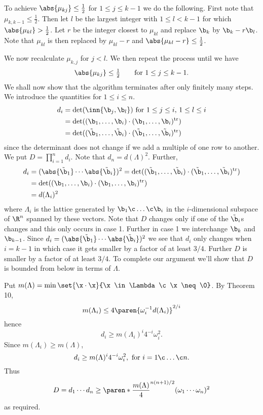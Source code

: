 To achieve $\abs{\mu_{kj}}\leq\frac12$ for $1\leq j\leq k-1$ we do the following.  First note that $\mu_{k,k-1}\leq\frac12$.  Then let $l$ be the largest integer with $1\leq l<k-1$ for which $\abs{\mu_{kl}}>\frac12$.  Let $r$ be the integer closest to $\mu_{kl}$ and replace $\b_k$ by $\b_k-r\b_l$.  Note that $\mu_{kl}$ is then replaced by $\mu_{kl}-r$ and $\abs{\mu_{kl}-r}\leq\frac12$.

We now recalculate $\mu_{k,j}$ for $j<l$.  We then repeat the process until we have
\[ \abs{\mu_{kj}}\leq\tfrac12 \qquad\text{for $1\leq j\leq k-1$} . \]
We shall now show that the algorithm terminates after only finitely many steps.  We introduce the quantities for $1\leq i\leq n$.
\begin{align*}
d_i &= \det(\inn{\b_j,\b_l}) \text{ for $1\leq j\leq i$, $1\leq l\leq i$} \\
&= \det((\b_1,\dotsc,\b_i)\cdot(\b_1,\dotsc,\b_i)^\text{tr}) \\
&= \det((\tilde\b_1,\dotsc,\tilde\b_i)\cdot(\tilde\b_1,\dotsc,\tilde\b_i)^\text{tr})
\end{align*}
since the determinant does not change if we add a multiple of one row to another.  We put $D=\prod_{i=1}^n d_i$.  Note that $d_n=d(\Lambda)^2$.  Further,
\begin{align*}
d_i &= (\abs{\tilde\b_1}\dotsm\abs{\tilde\b_i})^2 = \det((\tilde\b_1,\dotsc,\tilde\b_i)\cdot(\tilde\b_1,\dotsc,\tilde\b_i)^\text{tr}) \\
&= \det((\b_1,\dotsc,\b_i)\cdot(\b_1,\dotsc,\b_i)^\text{tr}) \\
&= d(\Lambda_i)^2
\end{align*}
where $\Lambda_i$ is the lattice generated by $\b_1\c \dotsc\c \b_i$ in the $i$-dimensional subspace of $\R^n$ spanned by these vectors.  Note that $D$ changes only if one of the $\tilde\b_i$s changes and this only occurs in case 1.  Further in case 1 we interchange $\b_k$ and $\b_{k-1}$.  Since $d_i = (\abs{\tilde\b_1}\dotsm\abs{\tilde\b_i})^2$ we see that $d_i$ only changes when $i=k-1$ in which case it gets smaller by a factor of at least $3/4$.  Further $D$ is smaller by a factor of at least $3/4$.  To complete our argument we'll show that $D$ is bounded from below in terms of $\Lambda$.

Put $m(\Lambda) = \min\set{\x\cdot\x}{\x\in\Lambda\c \x\neq\0}$.  By Theorem 10,
\[ m(\Lambda_i) \leq 4 \paren{\omega_i^{-1} d(\Lambda_i)}^{2/i} \]
hence
\[ d_i \geq m(\Lambda_i)^i 4^{-i} \omega_i^2 . \]
Since $m(\Lambda_i)\geq m(\Lambda)$,
\[ d_i \geq m(\Lambda)^i 4^{-i} \omega_i^2, \text{ for $i=1\c \dotsc\c n$}. \]
Thus
\[ D = d_1\dotsm d_n \geq \paren*{\frac{m(\Lambda)}{4}}^{n(n+1)/2} (\omega_1\dotsm\omega_n)^2 \]
as required.

